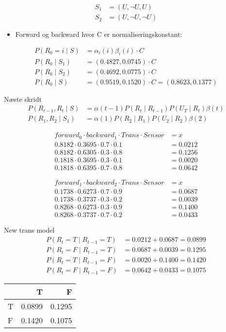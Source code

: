 \documentclass[colorlinks=true,linkcolor=blue]{article}
\begin{document}
\begin{align*}
S_1 &= (U, \neg U, U)\\
S_2 &= (U, \neg U, \neg U)
\end{align*}

\begin{itemize}
\item Forward og backward hvor C er normaliseringskonstant:
\end{itemize}
\begin{align*}
P(R_0 = i\mid S) &= \alpha_i(i)\beta_i(i) \cdot C\\
P(R_0 \mid S_1) &= (0.4827, 0.0745) \cdot C\\
P(R_0 \mid S_2) &= (0.4692, 0.0775) \cdot C\\
P(R_0 \mid S) &= (0.9519, 0.1520) \cdot  C = (0.8623, 0.1377)
\end{align*}

Næste skridt
\begin{align*}
P(R_{t-1}, R_t \mid S) &= \alpha(t-1) P(R_t \mid R_{t-1}) P(U_T \mid R_t) \beta(t)\\
P(R_1, R_2 \mid S_1) &= \alpha(1)P(R_2 \mid R_1)P(U_2 \mid R_2)\beta(2)
\end{align*}

\begin{align*}
forward_0 \cdot backward_1 \cdot Trans \cdot Sensor &= x\\
0.8182 \cdot 0.3695 \cdot 0.7 \cdot 0.1 &= 0.0212 \\
0.8182 \cdot 0.6305 \cdot 0.3 \cdot 0.8 &= 0.1256 \\
0.1818 \cdot 0.3695 \cdot 0.3 \cdot 0.1 &= 0.0020 \\
0.1818 \cdot 0.6395 \cdot 0.7 \cdot 0.8 &= 0.0642 
\end{align*}

\begin{align*}
forward_1 \cdot backward_2 \cdot Trans \cdot Sensor &= x\\
0.1738 \cdot 0.6273 \cdot 0.7 \cdot 0.9 &= 0.0687 \\
0.1738 \cdot 0.3737 \cdot 0.3 \cdot 0.2 &= 0.0039 \\
0.8268 \cdot 0.6273 \cdot 0.3 \cdot 0.9 &= 0.1400 \\
0.8268 \cdot 0.3737 \cdot 0.7 \cdot 0.2 &= 0.0433 
\end{align*}

New trans model
\begin{align*}
P(R_t = T \mid R_{t-1} = T) &= 0.0212 + 0.0687 = 0.0899\\
P(R_t = F \mid R_{t-1} = T) &= 0.0687 + 0.0039 = 0.1295\\
P(R_t = T \mid R_{t-1} = F) &= 0.0020 + 0.1400 = 0.1420\\
P(R_t = F \mid R_{t-1} = F) &= 0.0642 + 0.0433 = 0.1075
\end{align*}
\begin{center}
\begin{tabular}{l|rr}
 & T & F\\
\hline
T & 0.0899 & 0.1295\\
F & 0.1420 & 0.1075\\
\end{tabular}
\end{center}
\end{document}
